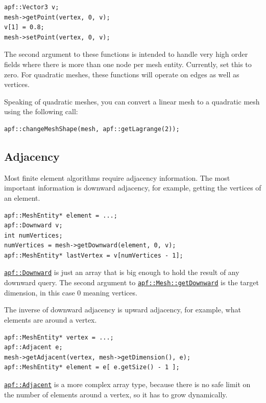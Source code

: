 \documentclass{article}
\begin{document}
\begin{lstlisting}
apf::Vector3 v;
mesh->getPoint(vertex, 0, v);
v[1] = 0.8;
mesh->setPoint(vertex, 0, v);
\end{lstlisting}

The second argument to these functions is intended to handle
very high order fields where there is more than one node
per mesh entity.
Currently, set this to zero.
For quadratic meshes, these functions will operate on edges as well as vertices.

Speaking of quadratic meshes, you can convert a linear mesh
to a quadratic mesh using the following call:

\begin{lstlisting}
apf::changeMeshShape(mesh, apf::getLagrange(2));
\end{lstlisting}

\subsection{Adjacency}

Most finite element algorithms require adjacency information.
The most important information is downward adjacency, for
example, getting the vertices of an element.

\begin{lstlisting}
apf::MeshEntity* element = ...;
apf::Downward v;
int numVertices;
numVertices = mesh->getDownward(element, 0, v);
apf::MeshEntity* lastVertex = v[numVertices - 1];
\end{lstlisting}

\href{http://scorec.rpi.edu/~dibanez/core/namespaceapf.html#a041eedcdfef4c64dafb2936219978328}{\texttt{apf::Downward}}
is just an array that is big enough to hold the result of any downward
query.
The second argument to
\href{http://scorec.rpi.edu/~dibanez/core/classapf_1_1Mesh.html#ae9af2075129ffd4553092049d85b276b}{\texttt{apf::Mesh::getDownward}}
is the target dimension, in this case 0 meaning vertices.

The inverse of downward adjacency is upward adjacency,
for example, what elements are around a vertex.

\begin{lstlisting}
apf::MeshEntity* vertex = ...;
apf::Adjacent e;
mesh->getAdjacent(vertex, mesh->getDimension(), e);
apf::MeshEntity* element = e[ e.getSize() - 1 ];
\end{lstlisting}

\href{http://scorec.rpi.edu/~dibanez/core/namespaceapf.html#a12d882b4789bf98322cbe6f02c91b1f8}{\texttt{apf::Adjacent}} is a more complex array type,
because there is no safe limit on the number of elements around
a vertex, so it has to grow dynamically.
\end{document}
